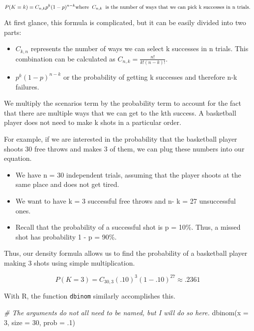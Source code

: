\documentclass[
]{article}
\newenvironment{Shaded}{\begin{snugshade}}{\end{snugshade}}
\newcommand{\AttributeTok}[1]{\textcolor[rgb]{0.77,0.63,0.00}{#1}}
\newcommand{\CommentTok}[1]{\textcolor[rgb]{0.56,0.35,0.01}{\textit{#1}}}
\newcommand{\DecValTok}[1]{\textcolor[rgb]{0.00,0.00,0.81}{#1}}
\newcommand{\FunctionTok}[1]{\textcolor[rgb]{0.00,0.00,0.00}{#1}}
\newcommand{\NormalTok}[1]{#1}
\begin{document}
\[P(K = k) = C_{n,k}p^{k}(1-p)^{n-k}\\\textrm{where} \hspace{0.2cm}C_{n,k}\hspace{0.2cm}\textrm{is the number of ways that we can pick k successes in n trials.}\]

At first glance, this formula is complicated, but it can be easily divided into two parts:

\begin{itemize}
\item
  \(C_{k,n}\) represents the number of ways we can select k successes in n trials. This combination can be calculated as \(C_{n,k}=\frac{n!}{k!(n-k)!}\).
\item
  \(p^{k}(1-p)^{n-k}\) or the probability of getting k successes and therefore n-k failures.
\end{itemize}

We multiply the scenarios term by the probability term to account for the fact that there are multiple ways that we can get to the kth success. A basketball player does not need to make k shots in a particular order.

For example, if we are interested in the probability that the basketball player shoots 30 free throws and makes 3 of them, we can plug these numbers into our equation.

\begin{itemize}
\item
  We have n = 30 independent trials, assuming that the player shoots at the same place and does not get tired.
\item
  We want to have k = 3 successful free throws and n- k = 27 unsuccessful ones.
\item
  Recall that the probability of a successful shot is p = 10\%. Thus, a missed shot has probability 1 - p = 90\%.
\end{itemize}

Thus, our density formula allows us to find the probability of a basketball player making 3 shots using simple multiplication.

\[P(K = 3) = C_{30,3}(.10)^{3}(1-.10)^{27}\approx.2361\]

With R, the function \texttt{dbinom} similarly accomplishes this.

\begin{Shaded}
\begin{Highlighting}[]
\CommentTok{\# The arguments do not all need to be named, but I will do so here.}
\FunctionTok{dbinom}\NormalTok{(}\AttributeTok{x =} \DecValTok{3}\NormalTok{, }\AttributeTok{size =} \DecValTok{30}\NormalTok{, }\AttributeTok{prob =}\NormalTok{ .}\DecValTok{1}\NormalTok{)}
\end{Highlighting}
\end{Shaded}
\end{document}
